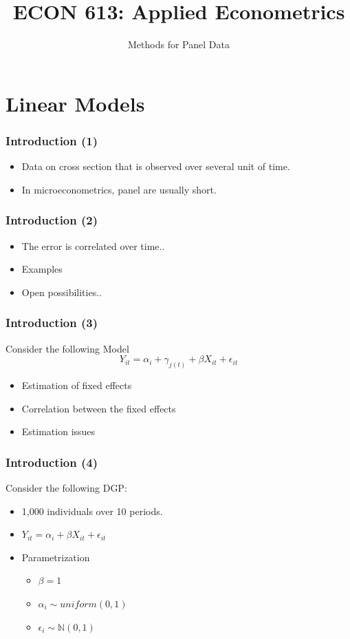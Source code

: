 \documentclass{beamer}
\newcommand{\1}{\mathbb{1}}
\newcommand{\N}{\mathbb{N}}
\begin{document}
\begin{frame}
\title{ECON 613: Applied Econometrics}
\subtitle{Methods for Panel Data}
\titlepage
\end{frame}

\section{Linear Models}

\begin{frame}
\tableofcontents[currentsection] 
\end{frame}

\begin{frame}\frametitle{Introduction (1)}
\begin{itemize}
 \item Data on cross section that is observed over several unit of time.  
 \item In microeconometrics, panel are usually short. 
\end{itemize}
\end{frame}

\begin{frame}\frametitle{Introduction (2)}
\begin{itemize}
\item The error is correlated over time..
\item Examples
\item Open possibilities..
\end{itemize}
\end{frame}

\begin{frame}\frametitle{Introduction (3)}
Consider the following Model
\begin{equation}
 Y_{it} = \alpha_i + \gamma_{j(t)} + \beta X_{it} + \epsilon_{it}
\end{equation}
\begin{itemize}
 \item Estimation of fixed effects
 \item Correlation between the fixed effects
 \item Estimation issues
\end{itemize}
\end{frame}

\begin{frame}\frametitle{Introduction (4)}
Consider the following DGP:
\begin{itemize}
 \item 1,000 individuals over 10 periods. 
 \item $Y_{it} = \alpha_i + \beta X_{it} + \epsilon_{it}$
 \item Parametrization 
 \begin{itemize}
  \item $\beta = 1$
  \item $\alpha_i \sim uniform(0,1)$
  \item $\epsilon_i\sim \N(0,1)$
 \end{itemize}
\end{itemize}
\end{frame}
\end{document}
